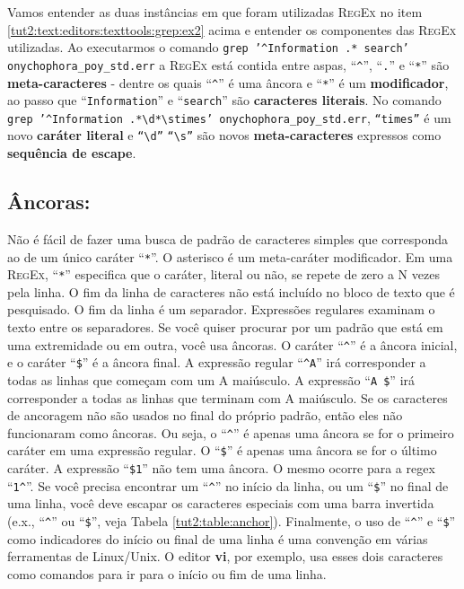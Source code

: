 \begin{refsection}
Vamos entender as duas instâncias em que foram utilizadas \textsc{RegEx} no item \ref{tut2:text:editors:texttools:grep:ex2} acima e entender os componentes das \textsc{RegEx} utilizadas. Ao executarmos o comando  \texttt{grep '\^{}Information .* search' onychophora\_poy\_std.err} a \textsc{RegEx} está contida entre aspas, ``\texttt{\^{}}'', ``\texttt{.}'' e ``\texttt{*}'' são \textbf{meta-caracteres} - dentre os quais ``\texttt{\^{}}'' é uma âncora e ``\texttt{*}'' é um \textbf{modificador}, ao passo que ``\texttt{Information}'' e ``\texttt{search}'' são \textbf{caracteres literais}. No comando \texttt{grep '\^{}Information .*\textbackslash d*\textbackslash stimes' onychophora\_poy\_std.err}, \texttt{``times''} é um novo \textbf{caráter literal} e \texttt{``\textbackslash d''} \texttt{``\textbackslash s''} são novos \textbf{meta-caracteres} expressos como \textbf{sequência de escape}.\\

\subsection{Âncoras:}\label{tut2:regex:anchor}

Não é fácil de fazer uma busca de padrão de caracteres simples que corresponda ao de um único caráter ``\texttt{*}''. O asterisco é um meta-caráter modificador. Em uma \textsc{RegEx}, ``\texttt{*}'' especifica que o caráter, literal ou não, se repete de zero a N vezes pela linha. O fim da linha de caracteres não está incluído no bloco de texto que é pesquisado. O fim da linha é um separador. Expressões regulares examinam o texto entre os separadores. Se você quiser procurar por um padrão que está em uma extremidade ou em outra, você usa âncoras. O caráter ``\texttt{\^{}}'' é a âncora inicial, e o caráter ``\texttt{\$}'' é a âncora final. A expressão regular ``\texttt{\^{}A}'' irá corresponder a todas as linhas que começam com um A maiúsculo. A expressão ``\texttt{A \$}'' irá corresponder a todas as linhas que terminam com A maiúsculo. Se os caracteres de ancoragem não são usados no final do próprio padrão, então eles não funcionaram como âncoras. Ou seja, o ``\texttt{\^{}}'' é apenas uma âncora se for o 
primeiro caráter em uma expressão regular. O ``\texttt{\$}'' é apenas uma âncora se for o último caráter. A expressão ``\texttt{\$1}'' não tem uma âncora. O mesmo ocorre para a regex ``\texttt{1\^{}}''. Se você precisa encontrar um ``\texttt{\^{}}'' no início da linha, ou um ``\texttt{\$}'' no final de uma linha, você deve escapar os caracteres especiais com uma barra invertida (e.x., ``\texttt{\^{}}'' ou ``\texttt{\$}'', veja Tabela \ref{tut2:table:anchor}). Finalmente, o uso de ``\texttt{\^{}}'' e ``\texttt{\$}'' como indicadores do início ou final de uma linha é uma convenção em várias ferramentas de Linux/Unix. O editor \textbf{vi}, por exemplo, usa esses dois caracteres como comandos para ir para o início ou fim de uma linha.\\


\end{refsection}
